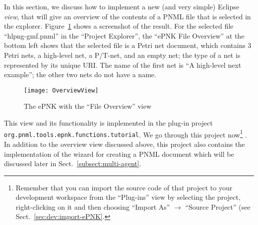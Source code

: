 In this section, we discuss how to implement a new (and very simple)
Eclipse \emph{view}, that will give an overview of the contents of a PNML
file that is selected in the explorer. Figure~\ref{fig:file-overview-view} shows
a screenshot of the result. For the selected file ``hlpng-gmf.pnml''
in the ``Project Explorer'',  the ``ePNK File Overview'' at the
bottom left shows that the selected file is a Petri net document,
which contains 3 Petri nets, a high-level net, a P/T-net, and
an empty net; the type of a net is represented by its unique
URI. The name of the first net is ``A high-level next
example''; the other two nets do not have a name.

\begin{figure}[hbt!!]
  \centerline{\texttt{[image: OverviewView]}}
  \caption{The ePNK with the ``File Overview'' view}
  \label{fig:file-overview-view}
\end{figure}

This view and its functionality is implemented in the plug-in project
{\tt org.pnml.tools.epnk.functions.tutorial}. We go through this
project now\footnote
 {Remember that you can import the source code of that project to your
  development workspace from the ``Plug-ins'' view by selecting the
  project, right-clicking on it and then choosing ``Import As'' $\rightarrow$
  ``Source Project'' (see Sect.~\ref{sec:dev:import-ePNK}.}%
.  In addition to the overview view discussed above, this project also contains
the implementation of the wizard for creating a PNML document which will be
discussed later in Sect.~\ref{subsect:multi-agent}.

